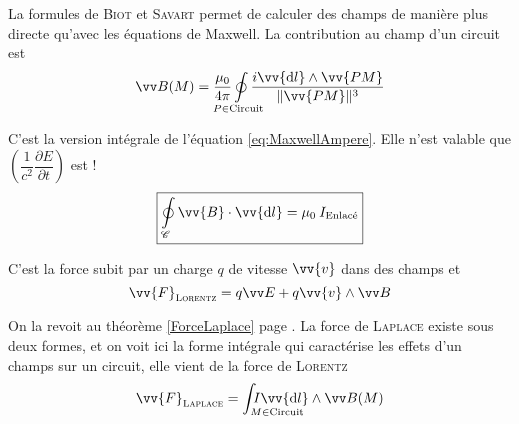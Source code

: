\documentclass[11pt,a4paper,fleqn,pdftex]{report}
\begin{document}
\begin{theorem}
La formules de \textsc{Biot} et \textsc{Savart}  permet de calculer des champs \B{} de manière plus directe qu'avec les équations de Maxwell. La contribution au champ \B{} d'un circuit est 
\begin{equation}\label{BiotSavart}
\B{}(M) = \dfrac{\mu_0}{4\pi} \oint \limits_{\mathclap{P\in \text{Circuit}}} \dfrac{i \vv{\d{}l} \wedge \vv{PM}}{\| \vv{PM} \| ^{3}}
\end{equation}
\end{theorem}
%
\needspace{5cm}
\begin{itheorem}
C'est la version intégrale de l'équation \eqref{eq:MaxwellAmpere}. \Attention Elle n'est valable que $\left( \dfrac{1}{c^2}\dfrac{\partial E}{\partial t} \right)
$ est  !
\begin{equation}\label{MaxwellAmpere}
\boxed{\oint \limits_\mathscr{C} \vv{B}\cdot \vv{\d l}= \mu_0 \: I_\text{Enlacé}}
\end{equation}
\end{itheorem}
%
\begin{dfn}
C'est la force subit par un charge $q$ de vitesse $\vv{v}$ dans des champs \E{} et \B{}
\begin{equation}\label{ForceLorentz}
\vv{F}_\text{\textsc{Lorentz}} = q\E + q \vv{v}\wedge \B
\end{equation}
\end{dfn}
%
\begin{theorem}
On la revoit au théorème \ref{ForceLaplace} page \pageref{ForceLaplace}.\newline
La force de \textsc{Laplace} existe sous deux formes, et on voit ici la forme intégrale qui caractérise les effets d'un champs \B{} sur un circuit, elle vient de la force de \textsc{Lorentz} 
\begin{equation}
\vv{F}_\text{\textsc{Laplace}}=\int_{\mathrlap{M\in \text{Circuit}}} I \vv{\d{}l} \wedge \B{}(M)
\end{equation}
\end{theorem}
\end{document}
